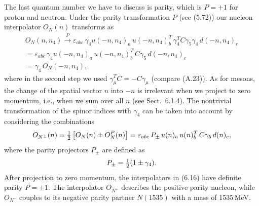 The last quantum number we have to discuss is parity, which is $P = +1$ for
proton and neutron. Under the parity transformation $P$ (see (5.72)) our
nucleon interpolator $O_N(n)$ transforms as
\begin{multline}
  O_N(n, n_4) \xrightarrow{\;P\;} \varepsilon_{abc}\,
    \gamma_4 u(-n, n_4)_a\, u(-n, n_4)_b^T\, \gamma_4^T C\gamma_5\gamma_4\,
    d(-n, n_4)_c \\
  = \varepsilon_{abc}\, \gamma_4 u(-n, n_4)_a\, u(-n, n_4)_b^T\, C\gamma_5\,
    d(-n, n_4)_c \\
  = \gamma_4\, O_N(-n, n_4) ,
\end{multline}
where in the second step we used $\gamma_\mu^T C = -C\gamma_\mu$ (compare
(A.23)). As for mesons, the change of the spatial vector $n$ into $-n$ is
irrelevant when we project to zero momentum, i.e., when we sum over all $n$
(see Sect.~6.1.4). The nontrivial transformation of the spinor indices with
$\gamma_4$ can be taken into account by considering the combinations
\begin{equation}
  O_{N^\pm}(n) = \tfrac{1}{2}\left[ O_N(n) \pm O_N^P(n) \right]
  = \varepsilon_{abc}\, P_\pm\, u(n)_a\, u(n)_b^T\, C\gamma_5\, d(n)_c ,
\end{equation}
where the parity projectors $P_\pm$ are defined as
\begin{equation}
  P_\pm = \tfrac{1}{2} (1 \pm \gamma_4) .
\end{equation}
After projection to zero momentum, the interpolators in (6.16) have definite
parity $P = \pm 1$. The interpolator $O_{N^+}$ describes the positive parity
nucleon, while $O_{N^-}$ couples to its negative parity partner $N(1535)$ with
a mass of 1535\,MeV.

